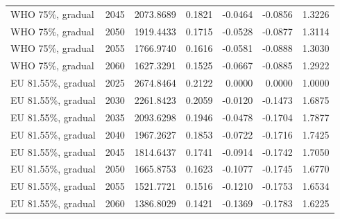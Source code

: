 \begin{longtable}{lrrrrrr}
WHO 75\%, gradual & 2045 & 2073.8689 & 0.1821 & -0.0464 & -0.0856 & 1.3226 \\
WHO 75\%, gradual & 2050 & 1919.4433 & 0.1715 & -0.0528 & -0.0877 & 1.3114 \\
WHO 75\%, gradual & 2055 & 1766.9740 & 0.1616 & -0.0581 & -0.0888 & 1.3030 \\
WHO 75\%, gradual & 2060 & 1627.3291 & 0.1525 & -0.0667 & -0.0885 & 1.2922 \\
EU 81.55\%, gradual & 2025 & 2674.8464 & 0.2122 & 0.0000 & 0.0000 & 1.0000 \\
EU 81.55\%, gradual & 2030 & 2261.8423 & 0.2059 & -0.0120 & -0.1473 & 1.6875 \\
EU 81.55\%, gradual & 2035 & 2093.6298 & 0.1946 & -0.0478 & -0.1704 & 1.7877 \\
EU 81.55\%, gradual & 2040 & 1967.2627 & 0.1853 & -0.0722 & -0.1716 & 1.7425 \\
EU 81.55\%, gradual & 2045 & 1814.6437 & 0.1741 & -0.0914 & -0.1742 & 1.7050 \\
EU 81.55\%, gradual & 2050 & 1665.8753 & 0.1623 & -0.1077 & -0.1745 & 1.6770 \\
EU 81.55\%, gradual & 2055 & 1521.7721 & 0.1516 & -0.1210 & -0.1753 & 1.6534 \\
EU 81.55\%, gradual & 2060 & 1386.8029 & 0.1421 & -0.1369 & -0.1783 & 1.6225 \\
\end{longtable}
\normalsize

